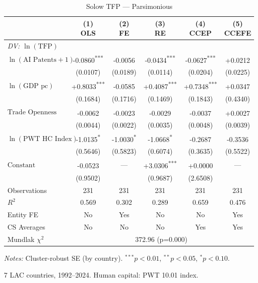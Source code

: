 \begin{table}[htbp]
\centering
\small
\caption{Solow TFP --- Parsimonious}
\label{tab:tab_solow_pars}
\begin{tabular}{lccccc}
\toprule
 & \makecell{(1)\\OLS} & \makecell{(2)\\FE} & \makecell{(3)\\RE} & \makecell{(4)\\CCEP} & \makecell{(5)\\CCEFE} \\
\midrule
\multicolumn{6}{l}{\textit{DV: $\ln(\text{TFP})$}} \\[4pt]
$\ln(\text{AI Patents}+1)$ & -0.0860\textsuperscript{***} & -0.0056\textsuperscript{} & -0.0434\textsuperscript{***} & -0.0627\textsuperscript{***} & +0.0212\textsuperscript{} \\
 & (0.0107) & (0.0189) & (0.0114) & (0.0204) & (0.0225) \\[2pt]
$\ln(\text{GDP pc})$ & +0.8033\textsuperscript{***} & -0.0585\textsuperscript{} & +0.4087\textsuperscript{***} & +0.7348\textsuperscript{***} & +0.0347\textsuperscript{} \\
 & (0.1684) & (0.1716) & (0.1469) & (0.1843) & (0.4340) \\[2pt]
$\text{Trade Openness}$ & -0.0062\textsuperscript{} & -0.0023\textsuperscript{} & -0.0029\textsuperscript{} & -0.0037\textsuperscript{} & +0.0027\textsuperscript{} \\
 & (0.0044) & (0.0022) & (0.0035) & (0.0048) & (0.0039) \\[2pt]
$\ln(\text{PWT HC Index})$ & -1.0135\textsuperscript{*} & -1.0030\textsuperscript{*} & -1.0668\textsuperscript{*} & -0.2687\textsuperscript{} & -0.3536\textsuperscript{} \\
 & (0.5646) & (0.5823) & (0.6074) & (0.3635) & (0.5522) \\[2pt]
$\text{Constant}$ & -0.0523\textsuperscript{} & --- & +3.0306\textsuperscript{***} & +0.0000\textsuperscript{} & --- \\
 & (0.9502) &  & (0.9687) & (2.6508) &  \\[2pt]
\midrule
Observations & 231 & 231 & 231 & 231 & 231 \\
$R^2$ & 0.569 & 0.302 & 0.289 & 0.659 & 0.476 \\
Entity FE & No & Yes & No & No & Yes \\
CS Averages & No & No & No & Yes & Yes \\
\midrule
Mundlak $\chi^2$ & \multicolumn{5}{c}{372.96 (p=0.000)} \\
\bottomrule
\end{tabular}
\begin{tablenotes}
\footnotesize
\item \textit{Notes:} Cluster-robust SE (by country). $^{***}p<0.01$, $^{**}p<0.05$, $^{*}p<0.10$.
\item 7 LAC countries, 1992--2024. Human capital: PWT 10.01 index.
\end{tablenotes}
\end{table}